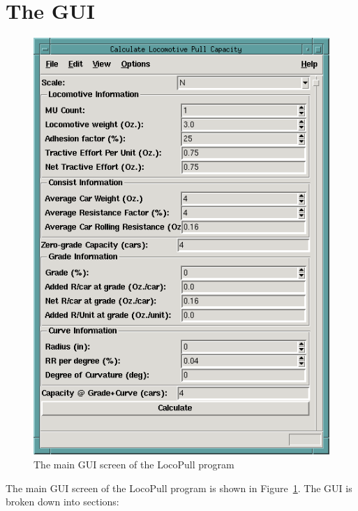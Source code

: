 \section{The GUI}
\begin{figure}[hbpt]
\begin{centering}
\includegraphics[width=5in]{LocoPullMain.png}
\caption{The main GUI screen of the LocoPull program}
\label{fig:locopull:main}
\end{centering}
\end{figure}
The main GUI screen of the LocoPull program is shown in
Figure~\ref{fig:locopull:main}. The GUI is broken down into sections: 
